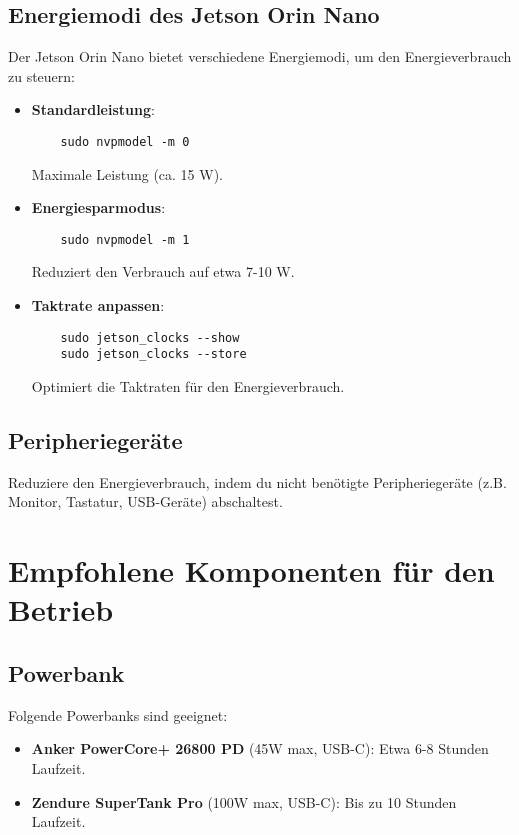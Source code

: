 \documentclass[12pt]{article}
\begin{document}
\subsection{Energiemodi des Jetson Orin Nano}
Der Jetson Orin Nano bietet verschiedene Energiemodi, um den Energieverbrauch zu steuern:
\begin{itemize}
    \item \textbf{Standardleistung}: 
    \begin{verbatim}
    sudo nvpmodel -m 0
    \end{verbatim}
    Maximale Leistung (ca. 15 W).
    
    \item \textbf{Energiesparmodus}: 
    \begin{verbatim}
    sudo nvpmodel -m 1
    \end{verbatim}
    Reduziert den Verbrauch auf etwa 7-10 W.
    
    \item \textbf{Taktrate anpassen}: 
    \begin{verbatim}
    sudo jetson_clocks --show
    sudo jetson_clocks --store
    \end{verbatim}
    Optimiert die Taktraten für den Energieverbrauch.
\end{itemize}

\subsection{Peripheriegeräte}
Reduziere den Energieverbrauch, indem du nicht benötigte Peripheriegeräte (z.B. Monitor, Tastatur, USB-Geräte) abschaltest.

\section{Empfohlene Komponenten für den Betrieb}

\subsection{Powerbank}
Folgende Powerbanks sind geeignet:
\begin{itemize}
    \item \textbf{Anker PowerCore+ 26800 PD} (45W max, USB-C): Etwa 6-8 Stunden Laufzeit.
    \item \textbf{Zendure SuperTank Pro} (100W max, USB-C): Bis zu 10 Stunden Laufzeit.
\end{itemize}
\end{document}
